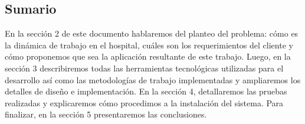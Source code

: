 \subsection{Sumario}
En la sección 2 de este documento hablaremos del planteo del problema: cómo es la dinámica de trabajo en el hospital, cuáles son los requerimientos del cliente y cómo proponemos que sea la aplicación resultante de este trabajo. Luego, en la sección 3 describiremos todas las herramientas tecnológicas utilizadas para el desarrollo así como las metodologías de trabajo implementadas y ampliaremos los detalles de diseño e implementación. En la sección 4, detallaremos las pruebas realizadas y explicaremos cómo procedimos a la instalación del sistema. Para finalizar, en la sección 5 presentaremos las conclusiones. 

